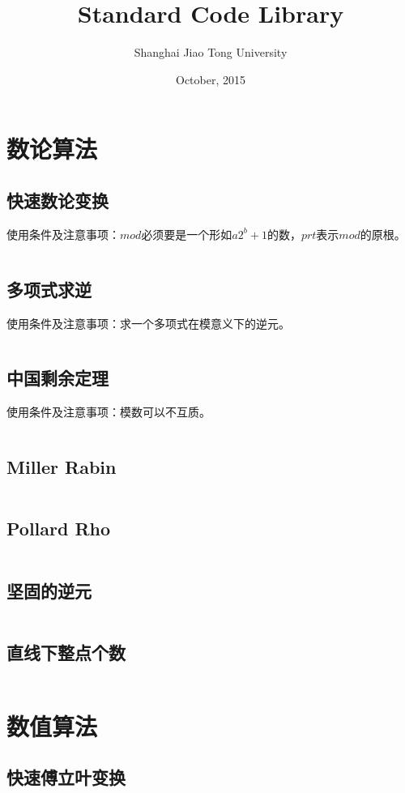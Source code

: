 \documentclass[a4paper,openany]{book}
\newcommand{\cppcode}[1]{
    \inputminted[mathescape,
    			 tabsize=4,
    			 linenos,
    			 frame=single,
    			 framesep=2mm,
    			 breakaftergroup=true,
    			 breakautoindent=true,
    			 breakbytoken=true,
    			 breaklines=true
    ]{cpp}{#1}
}
\begin{document}
	\title{\textbf{\LARGE{Standard Code Library}}}
	\author{Shanghai Jiao Tong University}
	\date{October, 2015}
	\maketitle
	\tableofcontents
	\begin{spacing}{1.0}
	\chapter{数论算法}
		\section{快速数论变换}
			使用条件及注意事项：$mod$必须要是一个形如$a2^b + 1$的数，$prt$表示$mod$的原根。
			\cppcode{Source/Number-Theory/Number-Theory-Transform.cpp}
		\section{多项式求逆}
			使用条件及注意事项：求一个多项式在模意义下的逆元。
			\cppcode{Source/Number-Theory/Inverse-Polynomial.cpp}
		\section{中国剩余定理}
			使用条件及注意事项：模数可以不互质。
			\cppcode{Source/Number-Theory/Chinese-Remainder-Theorem.cpp}
		\section{Miller Rabin}
			\cppcode{Source/Number-Theory/Miller-Rabin.cpp}
		\section{Pollard Rho}
			\cppcode{Source/Number-Theory/Pollard-Rho.cpp}
		\section{坚固的逆元}
			\cppcode{Source/Number-Theory/Quick-Inverse.cpp}
		\section{直线下整点个数}
			\cppcode{Source/Number-Theory/Lattice-Count.cpp}
	\chapter{数值算法}
		\section{快速傅立叶变换}
			\cppcode{Source/Numerical-Algorithm/Fast-Fourier-Transform.cpp}

\end{spacing}
\end{document}
